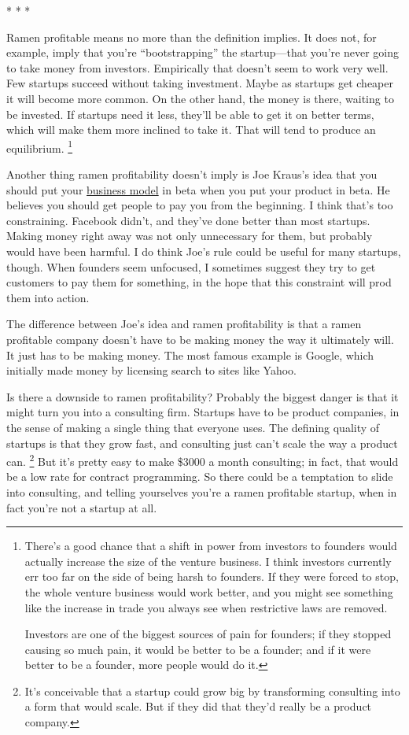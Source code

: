 \documentclass[12pt]{book}
\begin{document}
* * *

Ramen profitable means no more than the definition implies. It does not,
for example, imply that you're ``bootstrapping'' the startup---that
you're never going to take money from investors. Empirically that
doesn't seem to work very well. Few startups succeed without taking
investment. Maybe as startups get cheaper it will become more common. On
the other hand, the money is there, waiting to be invested. If startups
need it less, they'll be able to get it on better terms, which will make
them more inclined to take it. That will tend to produce an equilibrium.
\footnote{There's a good chance that a shift in power from investors to
founders would actually increase the size of the venture business. I
think investors currently err too far on the side of being harsh to
founders. If they were forced to stop, the whole venture business would
work better, and you might see something like the increase in trade you
always see when restrictive laws are removed.

Investors are one of the biggest sources of pain for founders; if they
stopped causing so much pain, it would be better to be a founder; and if
it were better to be a founder, more people would do it.}

Another thing ramen profitability doesn't imply is Joe Kraus's idea that
you should put your
\href{http://www.brendonwilson.com/blog/2006/04/30/joe-kraus-confessions-of-a-startup-addict/}{business
model} in beta when you put your product in beta. He believes you should
get people to pay you from the beginning. I think that's too
constraining. Facebook didn't, and they've done better than most
startups. Making money right away was not only unnecessary for them, but
probably would have been harmful. I do think Joe's rule could be useful
for many startups, though. When founders seem unfocused, I sometimes
suggest they try to get customers to pay them for something, in the hope
that this constraint will prod them into action.

The difference between Joe's idea and ramen profitability is that a
ramen profitable company doesn't have to be making money the way it
ultimately will. It just has to be making money. The most famous example
is Google, which initially made money by licensing search to sites like
Yahoo.

Is there a downside to ramen profitability? Probably the biggest danger
is that it might turn you into a consulting firm. Startups have to be
product companies, in the sense of making a single thing that everyone
uses. The defining quality of startups is that they grow fast, and
consulting just can't scale the way a product can.
\footnote{It's conceivable that a startup could grow big by transforming
consulting into a form that would scale. But if they did that they'd
really be a product company.} But it's pretty easy to make \$3000 a month
consulting; in fact, that would be a low rate for contract programming.
So there could be a temptation to slide into consulting, and telling
yourselves you're a ramen profitable startup, when in fact you're not a
startup at all.
\end{document}
